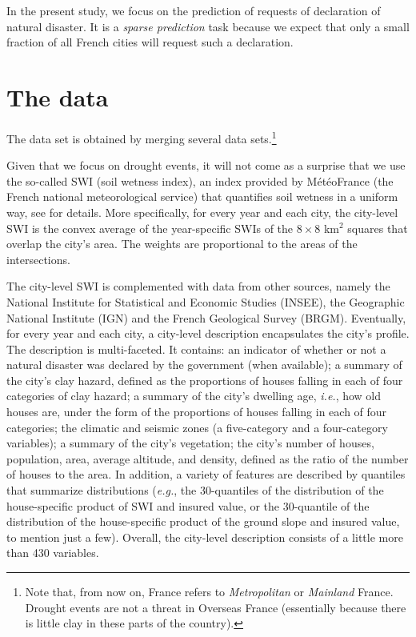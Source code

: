 In the present study, we focus on the prediction of requests of declaration of
natural disaster.  It  is a \textit{sparse prediction} task  because we expect
that  only  a  small  fraction  of  all French  cities  will  request  such  a
declaration.

\section{The data}
\label{sec:data}

The data  set is  obtained by merging  several data  sets.\footnote{Note that,
  from  now on,  France refers  to \textit{Metropolitan}  or \textit{Mainland}
  France.  Drought  events are  not a threat  in Overseas  France (essentially
  because there is little clay in these parts of the country).}

Given that we focus on drought events, it  will not come as a surprise that we
use the so-called  SWI (soil wetness index), an index  provided by MétéoFrance
(the French national meteorological service) that quantifies soil wetness in a
uniform  way,  see  \cite[][section~2.3]{Charpentier_2021} for  details.  More
specifically, for every  year and each city, the city-level  SWI is the convex
average of  the year-specific  SWIs of  the $8 \times  8$ km$^2$  squares that
overlap the  city's area.  The  weights are proportional  to the areas  of the
intersections.

The city-level  SWI is complemented with  data from other sources,  namely the
National  Institute   for  Statistical  and  Economic   Studies  (INSEE),  the
Geographic National Institute (IGN) and the French Geological Survey (BRGM).
Eventually,  for   every  year  and   each  city,  a   city-level  description
encapsulates  the  city's  profile.   The description  is  multi-faceted.   It
contains: an  indicator of whether or  not a natural disaster  was declared by
the government (when available); a summary  of the city's clay hazard, defined
as  the proportions  of houses  falling  in each  of four  categories of  clay
hazard; a  summary of the city's  dwelling age, \textit{i.e.}, how  old houses
are, under  the form  of the  proportions of  houses falling  in each  of four
categories;  the   climatic  and   seismic  zones   (a  five-category   and  a
four-category  variables); a  summary  of the  city's  vegetation; the  city's
number of houses, population, area,  average altitude, and density, defined as
the ratio  of the number  of houses  to the area.   In addition, a  variety of
features   are   described   by   quantiles   that   summarize   distributions
(\textit{e.g.},  the 30-quantiles  of the  distribution of  the house-specific
product of  SWI and insured value,  or the 30-quantile of  the distribution of
the house-specific product  of the ground slope and insured  value, to mention
just a  few).  Overall, the city-level  description consists of a  little more
than 430 variables.

